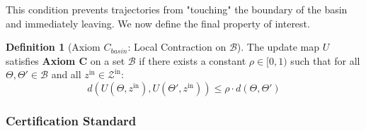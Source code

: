 \documentclass{article}
\theoremstyle{definition}
\newtheorem{definition}{Definition}[section]
\theoremstyle{plain}
\begin{document}
This condition prevents trajectories from "touching" the boundary of the basin and immediately leaving. We now define the final property of interest.

\begin{definition}[Axiom $C_{basin}$: Local Contraction on $\mathcal{B}$]
The update map $U$ satisfies \textbf{Axiom C} on a set $\mathcal{B}$ if there exists a constant $\rho \in [0, 1)$ such that for all $\Theta, \Theta' \in \mathcal{B}$ and all $z^{\text{in}} \in \mathcal{Z}^{\text{in}}$:
\[
d(U(\Theta, z^{\text{in}}), U(\Theta', z^{\text{in}})) \le \rho \cdot d(\Theta, \Theta')
\]
\end{definition}


\subsubsection{Certification Standard}
\end{document}
